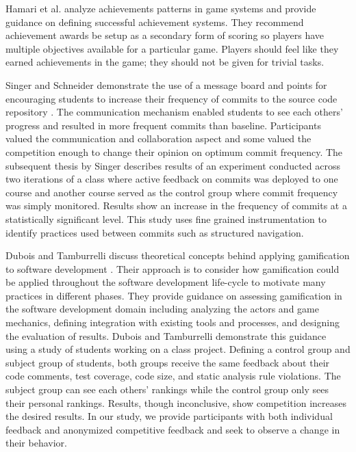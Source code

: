 \documentclass{sig-alternate}
\begin{document}
Hamari et al. analyze achievements patterns in game systems and provide guidance on defining successful achievement systems.  They recommend  achievement awards be setup as a secondary form of scoring so players have multiple objectives available for a particular game.  Players should feel like they earned achievements in the game; they should not be given for trivial tasks.

Singer and Schneider demonstrate the use of a message board and points for encouraging students to increase their frequency of commits to the source code repository \cite{Singer2012It}.  The communication mechanism enabled students to see each others' progress and resulted in more frequent commits than baseline.  Participants valued the communication and collaboration aspect and some valued the competition enough to change their opinion on optimum commit frequency.  The subsequent thesis by Singer \cite{Singer2013a} describes results of an experiment conducted across two iterations of a class where active feedback on commits was deployed to one course and another course served as the control group where commit frequency was simply monitored.  Results show an increase in the frequency of commits at a statistically significant level.  This study uses fine grained instrumentation to identify practices used between commits such as structured navigation.

Dubois and Tamburrelli discuss theoretical concepts behind applying gamification to software development \cite{Dubois2013Understanding}. Their approach is to consider how gamification could be applied throughout the software development life-cycle to motivate many practices in different phases.  They provide guidance on assessing gamification in the software development domain including analyzing the actors and game mechanics, defining integration with existing tools and processes, and designing the evaluation of results.  Dubois and Tamburrelli demonstrate this guidance using a study of students working on a class project.  Defining a control group and subject group of students, both groups receive the same feedback about their code comments, test coverage, code size, and static analysis rule violations.  The subject group can see each others' rankings while the control group only sees their personal rankings.  Results, though inconclusive, show competition increases the desired results.  In our study, we provide participants with both individual feedback and anonymized competitive feedback and seek to observe a change in their behavior.
\end{document}
